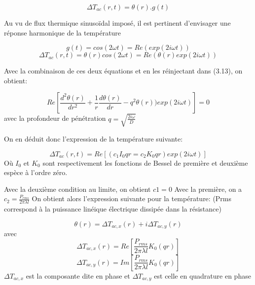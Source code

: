 \documentclass[10pt,a4paper]{report}
\begin{document}
\begin{center}
\begin{equation}
\Delta T_{ac}(r,t)=\theta(r).g(t)
\end{equation}
\end{center}
Au vu de flux thermique sinusoïdal imposé, il est pertinent d’envisager une réponse harmonique de la température
\begin{center}
\begin{equation}
g(t)=cos(2\omega t)=Re(exp(2i\omega t))
\end{equation}
\begin{equation}
\Delta T_{ac}(r,t)=\theta(r)cos(2\omega t)=Re(\theta(r)exp(2i\omega t))
\end{equation}
\end{center}
Avec la combinaison de ces deux équations et en les réinjectant dans (3.13), on obtient:
\begin{center}
\begin{equation}
Re[\frac{d^2\theta(r)}{dr^2}+\frac{1}{r}\frac{d\theta(r)}{dr}-q^2\theta(r))exp(2i\omega t)]=0
\end{equation}
avec la profondeur de pénétration $q=\sqrt{\frac{2i\omega}{D}}$
\end{center}
On en déduit donc l’expression de la température suivante:
\begin{center}
\begin{equation}
\Delta T_{ac}(r,t)=Re[(c_{1}I_{0}qr=c_{2}K_{0}qr)exp(2i\omega t)]
\end{equation}
Où $I_{0}$ et $K_{0}$ sont respectivement les fonctions de Bessel de première et deuxième espèce à l’ordre zéro.
\end{center}
Avec la deuxième condition au limite, on obtient $c1=0$
\newline
\newline
Avec la première, on a $c_{2}=\frac{P_{rms}}{2\pi\lambda l}$
\newline
On obtient alors l’expression suivante pour la température: (Prms correspond à la puissance linéique électrique dissipée dans la résistance)
\begin{center}
\begin{equation}
\theta(r)=\Delta T_{ac,x}(r)+i\Delta T_{ac,y}(r)
\end{equation}
avec
\begin{equation}
\Delta T_{ac,x}(r)=Re[\frac{P_{rms}}{2\pi\lambda l}K_{0}(qr)]
\end{equation}
\begin{equation}
\Delta T_{ac,y}(r)=Im[\frac{P_{rms}}{2\pi\lambda l}K_{0}(qr)]
\end{equation}
\newline
$\Delta T_{ac,x}$ est la composante dite en phase et $\Delta T_{ac,y}$ est celle en quadrature en phase
\end{center}
\end{document}
